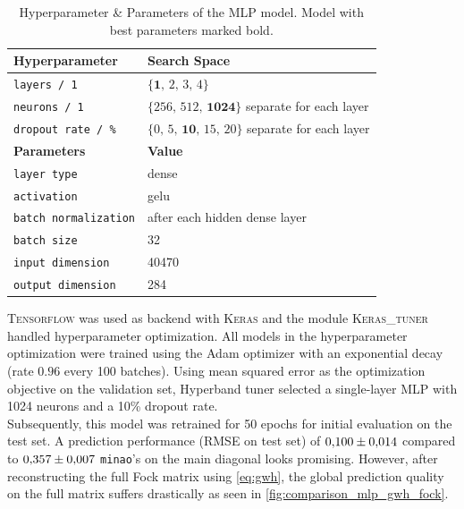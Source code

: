 \begin{table}[h]
    \caption[Hyperparameter \& Parameters of the MLP model]{Hyperparameter \& Parameters of the MLP model. Model with best parameters marked bold.}
    \label{tab:hyperparams_mlp}
    \centering
    \begin{tabular}{@{}ll@{}}
        \toprule
        \textbf{Hyperparameter}     & \textbf{Search Space}                  \\ 
        \midrule
        \texttt{layers / 1}          & $\{\textbf{1},\,2,\,3,\,4\}$                         \\
        \texttt{neurons / 1}   & $\{256,\,512,\,\textbf{1024}\}$  separate for each layer    \\
        \texttt{dropout rate / \%}   & $\{0,\,5,\,\textbf{10},\,15,\,20\}$ separate for each layer \\
        \bottomrule
        \textbf{Parameters}     & \textbf{Value}                  \\ 
        \midrule
        \texttt{layer type}          & dense                         \\
        \texttt{activation}          & gelu                         \\
        \texttt{batch normalization} & after each hidden dense layer \\
        \texttt{batch size}          & 32 \\
        \texttt{input dimension}     & 40470 \\
        \texttt{output dimension}    & 284 \\
        \bottomrule
    \end{tabular}
\end{table}

\textsc{Tensorflow} was used as backend with \textsc{Keras} and the module \textsc{Keras\_tuner} handled hyperparameter optimization. \parencite{ref:tensorflow,ref:keras,ref:kerastuner}
All models in the hyperparameter optimization were trained using the Adam optimizer with an exponential decay (rate $0.96$ every 100 batches). Using mean squared error as the optimization objective on the validation set, Hyperband tuner selected a single-layer MLP with 1024 neurons and a 10\% dropout rate.\\
Subsequently, this model was retrained for 50 epochs for initial evaluation on the test set. A prediction performance (RMSE on test set) of $\num{0.1 \pm 0.014}$ compared to $\num{0.357 \pm 0.007}$ \texttt{minao}'s on the main diagonal looks promising. However, after reconstructing the full Fock matrix using \autoref{eq:gwh}, the global prediction quality on the full matrix suffers drastically as seen in \autoref{fig:comparison_mlp_gwh_fock}. 

